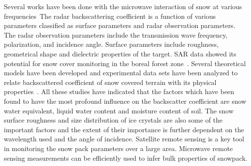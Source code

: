 \begin{description}
	Several works have been done with the microwave interaction of snow at various frequencies~\citep{stiles1980active,ulaby1980active,ulaby1984snowcover,rott1987possibilities,rott1988study}The radar backscattering coefficient is a function of various parameters classified as surface parameters and radar observation parameters. The radar observation parameters include the transmission wave frequency, polarization, and incidence angle. Surface parameters include roughness, geometrical shape and dielectric properties of the target. SAR data showed its potential for snow cover monitoring in the boreal forest zone~\citep{koskinen1997use}. Several theoretical models have been developed and experimental data sets have been analyzed to relate backscattered coefficient of snow covered terrain with its physical properties~\citep{Shi95wetness,Shi2000,shi2000depth,besic2012dry,besic2015stochastic}. All these studies have indicated that the factors which have been found to have the most profound influence on the backscatter coefficient are snow water equivalent, liquid water content and moisture content of soil. The snow surface roughness and size distribution of ice crystals are also some of the important factors and the extent of their importance is further dependent on the wavelength used and the angle of incidence. Satellite remote sensing is a key tool in monitoring the snow pack parameters over a large area. Microwave remote sensing measurements can be efficiently used to infer bulk properties of snowpack. 
	

\end{description}
